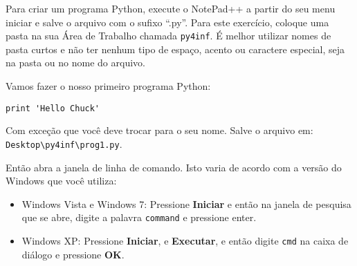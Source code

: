 Para criar um programa Python, execute o NotePad++ a partir do
seu menu iniciar e salve o arquivo com o sufixo ``.py''. Para
este exercício, coloque uma pasta na sua Área de Trabalho chamada
{\tt py4inf}. É melhor utilizar nomes de pasta curtos e não ter 
nenhum tipo de espaço, acento ou caractere especial, seja na pasta
ou no nome do arquivo.
%

Vamos fazer o nosso primeiro programa Python:
%

\beforeverb
\begin{verbatim}
print 'Hello Chuck'
\end{verbatim}
\afterverb


Com exceção que você deve trocar para o seu nome. Salve o arquivo
em: {\tt Desktop{\textbackslash}py4inf{\textbackslash}prog1.py}.
%

Então abra a janela de linha de comando. Isto varia de acordo com
a versão do Windows que você utiliza:
%

\begin{itemize}
\item Windows Vista e Windows 7: Pressione {\bf Iniciar}
e então na janela de pesquisa que se abre, digite a palavra
{\tt command} e pressione enter.
%

\item Windows XP: Pressione {\bf Iniciar}, e {\bf Executar}, e 
então digite {\tt cmd} na caixa de diálogo e pressione {\bf OK}.
\end{itemize}

